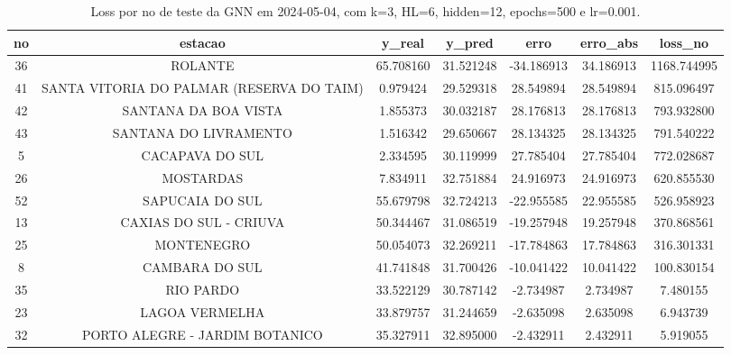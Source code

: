 \begin{table}[h]
\centering
\caption{Loss por no de teste da GNN em 2024-05-04, com k=3, HL=6, hidden=12, epochs=500 e lr=0.001.}
\label{tab:gnn_loss_k3_hl6_h12_e500_d20240504}
\begin{tabular}{ccccccc}
\toprule
no & estacao & y\_real & y\_pred & erro & erro\_abs & loss\_no \\
\midrule
36 & ROLANTE & 65.708160 & 31.521248 & -34.186913 & 34.186913 & 1168.744995 \\
41 & SANTA VITORIA DO PALMAR (RESERVA DO TAIM) & 0.979424 & 29.529318 & 28.549894 & 28.549894 & 815.096497 \\
42 & SANTANA DA BOA VISTA & 1.855373 & 30.032187 & 28.176813 & 28.176813 & 793.932800 \\
43 & SANTANA DO LIVRAMENTO & 1.516342 & 29.650667 & 28.134325 & 28.134325 & 791.540222 \\
5 & CACAPAVA DO SUL & 2.334595 & 30.119999 & 27.785404 & 27.785404 & 772.028687 \\
26 & MOSTARDAS & 7.834911 & 32.751884 & 24.916973 & 24.916973 & 620.855530 \\
52 & SAPUCAIA DO SUL & 55.679798 & 32.724213 & -22.955585 & 22.955585 & 526.958923 \\
13 & CAXIAS DO SUL - CRIUVA & 50.344467 & 31.086519 & -19.257948 & 19.257948 & 370.868561 \\
25 & MONTENEGRO & 50.054073 & 32.269211 & -17.784863 & 17.784863 & 316.301331 \\
8 & CAMBARA DO SUL & 41.741848 & 31.700426 & -10.041422 & 10.041422 & 100.830154 \\
35 & RIO PARDO & 33.522129 & 30.787142 & -2.734987 & 2.734987 & 7.480155 \\
23 & LAGOA VERMELHA & 33.879757 & 31.244659 & -2.635098 & 2.635098 & 6.943739 \\
32 & PORTO ALEGRE - JARDIM BOTANICO & 35.327911 & 32.895000 & -2.432911 & 2.432911 & 5.919055 \\
\bottomrule
\end{tabular}
\end{table}
